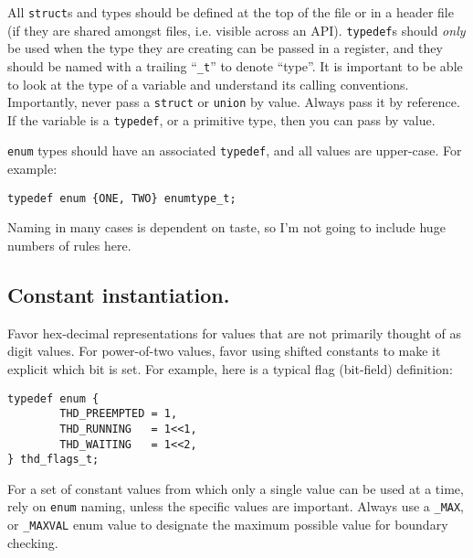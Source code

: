 \documentclass[11pt,onecolumn]{article}
\newcommand{\head}[1]{\vspace{0.4em}\noindent{\bf #1}}
\begin{document}
\head{Type naming and usage.} All {\tt struct}s and types should be
defined at the top of the file or in a header file (if they are shared
amongst files, i.e. visible across an API).  {\tt typedef}s should
{\em only} be used when the type they are creating can be passed in a
register, and they should be named with a trailing ``{\tt \_t}'' to
denote ``type''.  It is important to be able to look at the type of a
variable and understand its calling conventions.  Importantly, never
pass a {\tt struct} or {\tt union} by value.  Always pass it by
reference.  If the variable is a {\tt typedef}, or a primitive type,
then you can pass by value.

{\tt enum} types should have an associated {\tt typedef}, and all
values are upper-case.  For example:

    \begin{minipage}{3in}
      \footnotesize
      \lstset{language=C}
      \begin{lstlisting}
typedef enum {ONE, TWO} enumtype_t;
      \end{lstlisting}
    \end{minipage}

Naming in many cases is dependent on taste, so I'm not going to
include huge numbers of rules here.

\subsection{Constant instantiation.}  Favor hex-decimal
representations for values that are not primarily thought of as digit
values.  For power-of-two values, favor using shifted constants to
make it explicit which bit is set.  For example, here is a typical
flag (bit-field) definition:

    \begin{minipage}{3in}
      \footnotesize
      \lstset{language=C}
      \begin{lstlisting}
typedef enum {
        THD_PREEMPTED = 1,
        THD_RUNNING   = 1<<1,
        THD_WAITING   = 1<<2,
} thd_flags_t;
      \end{lstlisting}
    \end{minipage}

For a set of constant values from which only a single value can be
used at a time, rely on {\tt enum} naming, unless the specific values
are important.  Always use a {\tt \_MAX}, or {\tt \_MAXVAL} enum value
to designate the maximum possible value for boundary checking.
\end{document}
